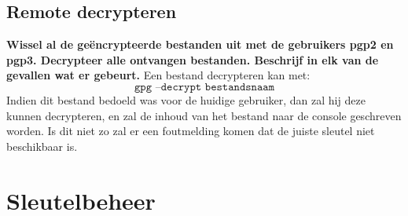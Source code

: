 \documentclass{report}
\begin{document}
\subsection{Remote decrypteren}
\textbf{Wissel al de geëncrypteerde bestanden uit met de gebruikers pgp2 en pgp3. Decrypteer alle ontvangen bestanden. Beschrijf in elk van de gevallen wat er gebeurt.}
Een bestand decrypteren kan met:
$$\texttt{gpg --decrypt bestandsnaam}$$
Indien dit bestand bedoeld was voor de huidige gebruiker, dan zal hij deze kunnen decrypteren, en zal de inhoud van het bestand naar de console geschreven worden. Is dit niet zo zal er een foutmelding komen dat de juiste sleutel niet beschikbaar is.

\section{Sleutelbeheer}
\end{document}
